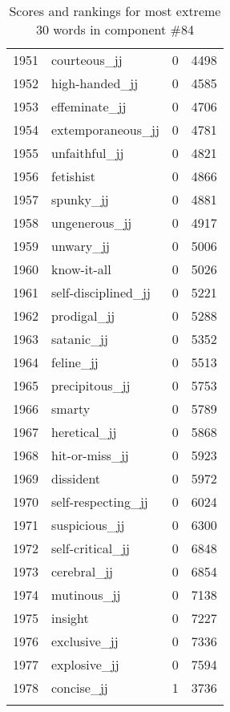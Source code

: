 \begin{longtable}[!htbp]{| rlr@{.}l |}
    1951 & courteous\_jj & 0 & 4498 \\
    1952 & high-handed\_jj & 0 & 4585 \\
    1953 & effeminate\_jj & 0 & 4706 \\
    1954 & extemporaneous\_jj & 0 & 4781 \\
    1955 & unfaithful\_jj & 0 & 4821 \\
    1956 & fetishist & 0 & 4866 \\
    1957 & spunky\_jj & 0 & 4881 \\
    1958 & ungenerous\_jj & 0 & 4917 \\
    1959 & unwary\_jj & 0 & 5006 \\
    1960 & know-it-all & 0 & 5026 \\
    1961 & self-disciplined\_jj & 0 & 5221 \\
    1962 & prodigal\_jj & 0 & 5288 \\
    1963 & satanic\_jj & 0 & 5352 \\
    1964 & feline\_jj & 0 & 5513 \\
    1965 & precipitous\_jj & 0 & 5753 \\
    1966 & smarty & 0 & 5789 \\
    1967 & heretical\_jj & 0 & 5868 \\
    1968 & hit-or-miss\_jj & 0 & 5923 \\
    1969 & dissident & 0 & 5972 \\
    1970 & self-respecting\_jj & 0 & 6024 \\
    1971 & suspicious\_jj & 0 & 6300 \\
    1972 & self-critical\_jj & 0 & 6848 \\
    1973 & cerebral\_jj & 0 & 6854 \\
    1974 & mutinous\_jj & 0 & 7138 \\
    1975 & insight & 0 & 7227 \\
    1976 & exclusive\_jj & 0 & 7336 \\
    1977 & explosive\_jj & 0 & 7594 \\
    1978 & concise\_jj & 1 & 3736 \\
    \hline
    \caption{Scores and rankings for most extreme 30 words in component \#84} \\
\end{longtable}
